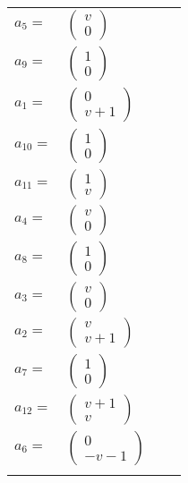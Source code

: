 \documentclass[1p]{elsarticle_modified}
\theoremstyle{definition}
\begin{document}
\begin{tabular}{m{7pt} m{180pt} m{7pt} m{180pt} }
\flushright $a_{5}=$&$\begin{pmatrix}v\\0\end{pmatrix}$ \\
\flushright $a_{9}=$&$\begin{pmatrix}1\\0\end{pmatrix}$ \\
\flushright $a_{1}=$&$\begin{pmatrix}0\\v+1\end{pmatrix}$ \\
\flushright $a_{10}=$&$\begin{pmatrix}1\\0\end{pmatrix}$ \\
\flushright $a_{11}=$&$\begin{pmatrix}1\\v\end{pmatrix}$ \\
\flushright $a_{4}=$&$\begin{pmatrix}v\\0\end{pmatrix}$ \\
\flushright $a_{8}=$&$\begin{pmatrix}1\\0\end{pmatrix}$ \\
\flushright $a_{3}=$&$\begin{pmatrix}v\\0\end{pmatrix}$ \\
\flushright $a_{2}=$&$\begin{pmatrix}v\\v+1\end{pmatrix}$ \\
\flushright $a_{7}=$&$\begin{pmatrix}1\\0\end{pmatrix}$ \\
\flushright $a_{12}=$&$\begin{pmatrix}v+1\\v\end{pmatrix}$ \\
\flushright $a_{6}=$&$\begin{pmatrix}0\\- v-1\end{pmatrix}$\\&\end{tabular}
\end{document}
